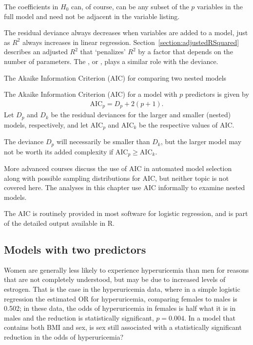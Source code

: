 The coefficients in $H_0$ can, of course, can be any subset of the $p$ variables in the full model and need not be adjacent in the variable listing.

The residual deviance always decreases when variables are added to a model, just as $R^2$ always increases in linear regression.  Section~\ref{section:adjustedRSquared} describes an adjusted $R^2$ that `penalizes' $R^2$ by a factor that depends on the number of parameters.  The , or , plays a similar role with the deviance.

\begin{onebox}{The Akaike Information Criterion (AIC) for comparing two nested models}

The Akaike Information Criterion (AIC) for a model with $p$ predictors is given by 
\begin{align*}
  \text{AIC}_p = D_p + 2(p + 1).
\end{align*}
Let $D_p$ and $D_k$ be the residual deviances for the larger and smaller (nested) models, respectively, and let $\text{AIC}_p$ and $\text{AIC}_k$ be the respective values of AIC.

The deviance $D_p$ will necessarily be smaller than $D_k$, but the larger model may not be worth its added complexity if $\text{AIC}_p \geq \text{AIC}_k$.

\end{onebox}

More advanced courses discuss the use of AIC in automated model selection along with possible sampling distributions for AIC, but neither topic is not covered here.  The analyses in this chapter use AIC informally to examine nested models.  

The AIC is routinely provided in most software for logistic regression, and is part of the detailed output available in \textsf{R}.

\subsection{Models with two predictors}
\label{section:modelsWithTwoPredictors}

Women are generally less likely to experience hyperuricemia than men for reasons that are not completely understood, but may be due to increased levels of estrogen.  That is the case in the hyperuricemia data, where in a simple logistic regression the estimated OR for hyperuricemia, comparing females to males is 0.502; in these data, the odds of hyperuricemia in females is half what it is in males and the reduction is statistically significant, $p = 0.004$.
In a model that contains both BMI and sex, is sex still associated with a statistically significant reduction in the odds of hyperuricemia?

